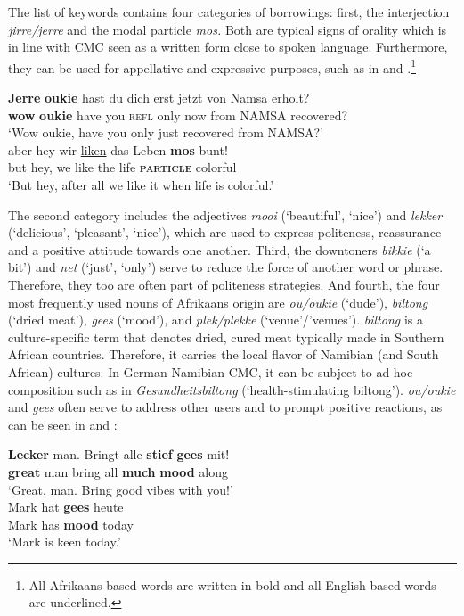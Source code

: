 \documentclass[output=paper]{langsci/langscibook}
\begin{document}
The list of keywords contains four categories of borrowings: first, the interjection \textit{jirre/jerre} and the modal particle \textit{mos.} Both are typical signs of orality which is in line with CMC seen as a written form close to spoken language. Furthermore, they can be used for appellative and expressive purposes, such as in  and .\footnote{All Afrikaans-based words are written in bold and all English-based words are underlined.}

\ea
\label{ex:radke:5}
\gll \textbf{Jerre} \textbf{oukie} hast du dich erst jetzt von Namsa erholt? \\
	\textbf{wow} \textbf{oukie} have you \textsc{refl} only now from NAMSA recovered?\\
	\glt `Wow oukie, have you only just recovered from NAMSA?'\\
\ex
\label{ex:radke:6}
\gll aber hey wir \underline{liken} das Leben \textbf{mos} bunt!\\
   but hey, we like the life \textbf{\textsc{particle}}  colorful\\
\glt  `But hey, after all we like it when life is colorful.'\\
\z

\begin{sloppypar}
The second category includes the adjectives \textit{mooi} (‘beautiful’, ‘nice’) and \textit{lekker} (‘delicious’, ‘pleasant’, ‘nice’), which are used to express politeness, reassurance and a positive attitude towards one another. Third, the downtoners \textit{bikkie} (‘a bit’) and \textit{net} (‘just’, ‘only’) serve to reduce the force of another word or phrase. Therefore, they too are often part of politeness strategies. And fourth, the four most frequently used nouns of Afrikaans origin are \textit{ou/oukie} (‘dude’), \textit{biltong} (‘dried meat’), \textit{gees} (‘mood’), and \textit{plek/plekke} (‘venue’/’venues’). \textit{biltong} is a culture-speci\-fic term that denotes dried, cured meat typically made in Southern African countries. Therefore, it carries the local flavor of Namibian (and South African) cultures. In German-Namibian CMC, it can be subject to ad-hoc composition such as in \textit{Gesundheitsbiltong} (‘health-stimulating biltong’). \textit{ou/oukie} and \textit{gees} often serve to address other users and to prompt positive reactions, as can be seen in  and :
\end{sloppypar}

\ea
\label{ex:radke:7}
 \gll \textbf{Lecker} man. Bringt alle \textbf{stief} \textbf{gees} mit! \\
   		\textbf{great} man bring all \textbf{much} \textbf{mood} along\\
     	\glt `Great, man. Bring good vibes with you!'\\
\ex\label{ex:radke:8}
	\gll Mark hat \textbf{gees} heute \\
		Mark has \textbf{mood} today\\
     \glt `Mark is keen today.' \\
\z
 
\end{document}

